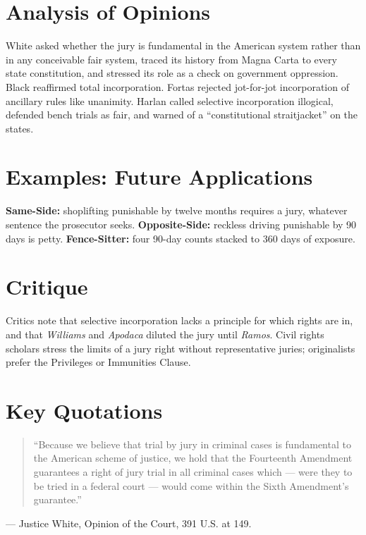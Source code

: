 \documentclass[12pt]{article}
\begin{document}
\section{Analysis of Opinions}
White asked whether the jury is fundamental in the American system rather than in any conceivable fair system, traced its history from Magna Carta to every state constitution, and stressed its role as a check on government oppression. Black reaffirmed total incorporation. Fortas rejected jot-for-jot incorporation of ancillary rules like unanimity. Harlan called selective incorporation illogical, defended bench trials as fair, and warned of a ``constitutional straitjacket'' on the states.

\section{Examples: Future Applications}
\textbf{Same-Side:} shoplifting punishable by twelve months requires a jury, whatever sentence the prosecutor seeks. \textbf{Opposite-Side:} reckless driving punishable by 90 days is petty. \textbf{Fence-Sitter:} four 90-day counts stacked to 360 days of exposure.

\section{Critique}
Critics note that selective incorporation lacks a principle for which rights are in, and that \textit{Williams} and \textit{Apodaca} diluted the jury until \textit{Ramos}. Civil rights scholars stress the limits of a jury right without representative juries; originalists prefer the Privileges or Immunities Clause.

\section{Key Quotations}
\begin{quote}
``Because we believe that trial by jury in criminal cases is fundamental to the American scheme of justice, we hold that the Fourteenth Amendment guarantees a right of jury trial in all criminal cases which --- were they to be tried in a federal court --- would come within the Sixth Amendment's guarantee.''
\end{quote}
\noindent --- Justice White, Opinion of the Court, 391 U.S. at 149.
\end{document}
